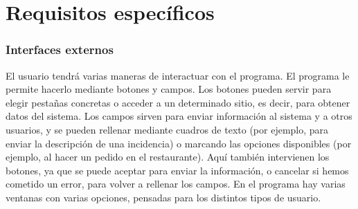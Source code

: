 \documentclass[spanish,a4paper,11pt, twoside]{report}	%
\begin{document}
\newpage
\mbox{}
\thispagestyle{empty}						%
\newpage

\setcounter{section}{0}

\part{Requisitos específicos}



		\section{Interfaces externos}
			
			El usuario tendrá varias maneras de interactuar con el programa. El programa le permite hacerlo mediante botones y campos. Los botones pueden servir para elegir pestañas concretas o acceder a un determinado sitio, es decir, para obtener datos del sistema. Los campos sirven para enviar información al sistema y a otros usuarios, y se pueden rellenar mediante cuadros de texto (por ejemplo, para enviar la descripción de una incidencia) o marcando las opciones disponibles (por ejemplo, al hacer un pedido en el restaurante). Aquí también intervienen los botones, ya que se puede aceptar para enviar la información, o cancelar si hemos cometido un error, para volver a rellenar los campos. En el programa hay varias ventanas con varias opciones, pensadas para los distintos tipos de usuario.
\end{document}

